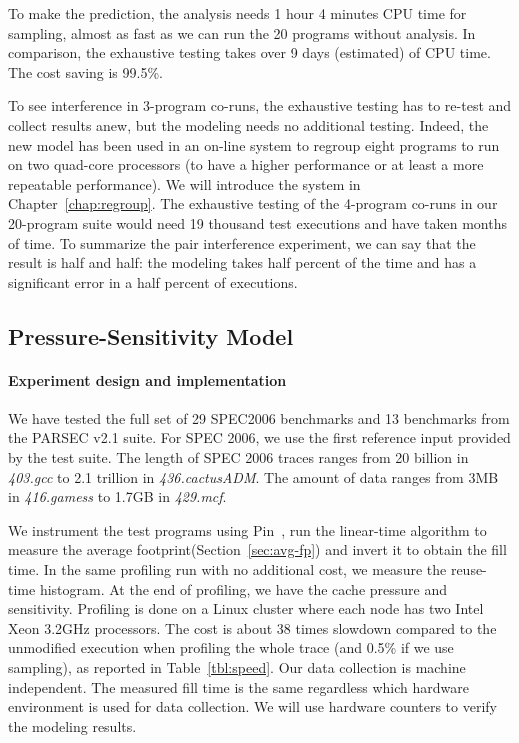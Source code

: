 To make the prediction, the analysis needs 1 hour 4 minutes CPU time
for sampling, almost as fast as we can run the 20 programs without
analysis.  In comparison, the exhaustive testing takes over 9 days
(estimated) of CPU time.  The cost saving is 99.5\%. 

To see interference in
3-program co-runs, the exhaustive testing has to re-test and collect
results anew, but the modeling needs no additional testing.
Indeed, the new model has been used in an on-line system 
to regroup eight programs to run on two quad-core processors 
(to have a higher performance or at least a more repeatable
performance). We will introduce the system in
Chapter~\ref{chap:regroup}. The exhaustive testing of the 4-program
co-runs in our 20-program suite would need 19 thousand test executions
and have taken months of time. To summarize the pair interference
experiment, we can say that the result is half and half: the modeling
takes half percent of the time and has a significant error in a half
percent of executions. 

\subsection{Pressure-Sensitivity Model}
\paragraph{Experiment design and implementation}
We have tested the full set of 29 SPEC2006 benchmarks and 13 benchmarks
from the PARSEC v2.1 suite. For SPEC 2006, we use the first reference
input provided by the test suite.  The length of SPEC 2006 traces
ranges from 20 billion in \emph{403.gcc} to 2.1 trillion in
\emph{436.cactusADM}.  The amount of data ranges from 3MB in
\emph{416.gamess} to 1.7GB in \emph{429.mcf}.  

We instrument the test programs using Pin~\cite{Pin:PLDI05}, run the
linear-time algorithm to measure the average
footprint(Section~\ref{sec:avg-fp}) and invert it to obtain the fill
time. In the same profiling run with no additional cost, we measure
the reuse-time histogram.  At the end of profiling, we have the cache
pressure and sensitivity. Profiling is done on a Linux cluster where
each node has two Intel Xeon 3.2GHz processors.  The cost is about 38
times slowdown compared to the unmodified execution when profiling the
whole trace (and 0.5\% if we use sampling), as reported in
Table~\ref{tbl:speed}. Our data collection is machine independent.
The measured fill time is the same regardless which hardware
environment is used for data collection.  We will use hardware
counters to verify the modeling results. 

